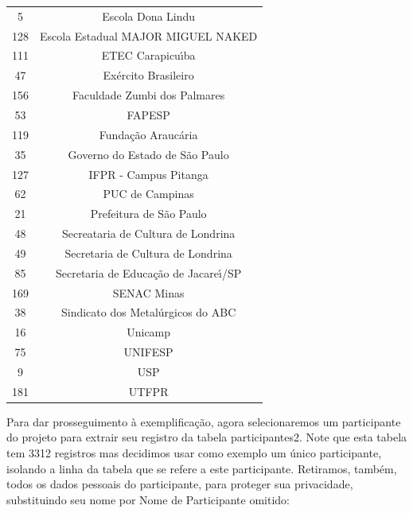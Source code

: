 \documentclass[
12pt,		%
openright,	%
twoside,  %
a4paper,			%
chapter=TITLE,		%
english,			%
french,				%
spanish,			%
brazil				%
]{USPSC-classe/USPSC_RedarTex}
\begin{document}
\begin{table}[htb]
\begin{tabular}{|c|c|}
                    5  &  Escola Dona Lindu \\
                  128  &  Escola Estadual MAJOR MIGUEL NAKED \\
                  111  &  ETEC Carapicu\'{\i}ba \\
                   47  &  Ex\'ercito Brasileiro \\
                  156  &  Faculdade Zumbi dos Palmares \\
                   53  &  FAPESP \\
                  119  &  Funda\c{c}\~ao Arauc\'aria \\
                   35  &  Governo do Estado de S\~ao Paulo \\
                  127  &  IFPR - Campus Pitanga \\
                   62  &  PUC de Campinas \\
                   21  &  Prefeitura de S\~ao Paulo           \\
                   48  &  Secreataria de Cultura de Londrina \\
                   49  &  Secretaria de Cultura de Londrina \\
                   85  &  Secretaria de Educa\c{c}\~ao de Jacare\'{\i}/SP \\
                  169  &  SENAC Minas  \\
                   38  &  Sindicato dos Metal\'urgicos do ABC \\
                   16  &  Unicamp \\
                   75  &  UNIFESP  \\
                    9  &  USP \\
                  181  &  UTFPR \\
\hline
\end{tabular}
\end{table}


Para dar prosseguimento \`a exemplifica\c{c}\~ao, agora selecionaremos um participante do projeto para extrair seu registro da tabela \textquotedbl participantes2\textquotedbl . Note que esta tabela tem 3312 registros mas decidimos usar como exemplo um \'unico participante, isolando a linha da tabela que se refere a este participante. Retiramos, tamb\'em, todos os dados pessoais do participante, para proteger sua privacidade, substituindo seu nome por \textquotedbl Nome de Participante omitido\textquotedbl :
\end{document}
